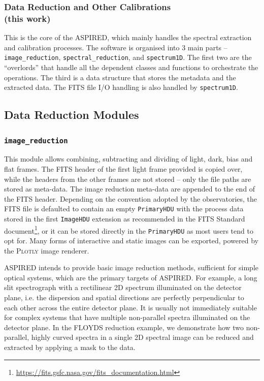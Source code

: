 \documentclass[twocolumn, linenumbers]{aastex631}
\begin{document}
\subsubsection*{Data Reduction and Other Calibrations\\(this work)}
This is the core of the \textsc{ASPIRED}, which mainly handles the spectral
extraction and calibration processes. The software is organised into
3 main parts -- \texttt{image\_reduction}, \texttt{spectral\_reduction},
and \texttt{spectrum1D}. The first two are the ``overlords'' that handle
all the dependent classes and functions to orchestrate the operations.
The third is a data structure that stores the metadata and the extracted
data. The FITS file I/O handling is also handled by \texttt{spectrum1D}.


\subsection{Data Reduction Modules}

\subsubsection{\texttt{image\_reduction}}
This module allows combining, subtracting and dividing of light,
dark, bias and flat frames. The FITS header of the first light frame provided
is copied over, while the headers from the other frames are not stored -- only
the file paths are stored as meta-data. The image reduction meta-data
are appended to the end of the FITS header. Depending on the convention
adopted by the observatories, the FITS file is defaulted to contain an empty \texttt{PrimaryHDU}
with the process data stored in the first \texttt{ImageHDU} extension as
recommended in the FITS Standard 
document\footnote{\url{https://fits.gsfc.nasa.gov/fits_documentation.html}},
or it can be stored directly in the \texttt{PrimaryHDU} as most users tend
to opt for. Many forms of interactive and static images can be exported,
powered by the \textsc{Plotly} image renderer.

\textsc{ASPIRED} intends to provide basic image reduction methods, sufficient for simple
optical systems, which are the primary targets of \textsc{ASPIRED}. For
example, a long slit spectrograph with a rectilinear 2D spectrum illuminated
on the detector plane, i.e. the dispersion and spatial directions are perfectly
perpendicular to each other across the entire detector plane. It is usually
not immediately suitable for complex systems that have multiple non-parallel
spectra illuminated on the detector plane. In the FLOYDS reduction example,
we demonstrate how two non-parallel, highly curved spectra in a single
2D spectral image can be reduced and extracted by applying a mask to the
data.
\end{document}
